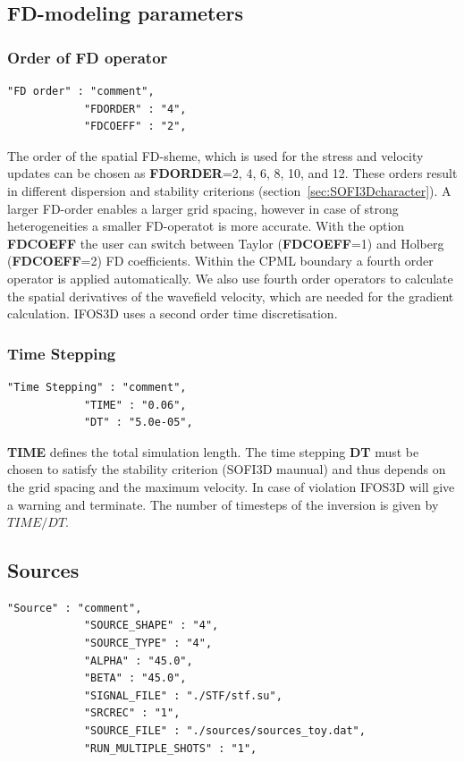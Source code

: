 \subsection{FD-modeling parameters}
\subsubsection*{Order of FD operator}
\begin{verbatim}
"FD order" : "comment",
			"FDORDER" : "4",
			"FDCOEFF" : "2",
\end{verbatim}

The order of the spatial FD-sheme,  which is used for the stress and velocity updates can be chosen as \textbf{FDORDER}=2, 4, 6, 8, 10, and 12. 
These orders result in different dispersion and stability criterions (section~\ref{sec:SOFI3Dcharacter}). A larger FD-order enables a larger grid spacing, however in case of strong heterogeneities a smaller FD-operatot is more accurate. 
With the option \textbf{FDCOEFF} the user can switch between Taylor (\textbf{FDCOEFF}=1) and Holberg (\textbf{FDCOEFF}=2) FD coefficients. Within the CPML boundary a fourth order operator is applied automatically. 
We also use fourth order operators to calculate the spatial derivatives of the wavefield velocity, which are needed for the gradient calculation. IFOS3D uses a second order time discretisation.
\subsubsection*{Time Stepping}
\begin{verbatim}
"Time Stepping" : "comment",
			"TIME" : "0.06",
			"DT" : "5.0e-05",
\end{verbatim}

\textbf{TIME} defines the total simulation length.  The time stepping \textbf{DT} must be chosen to satisfy the stability criterion (SOFI3D  maunual) and thus depends on the grid spacing and the maximum velocity. 
In case of violation IFOS3D will give a warning and terminate. The number of timesteps of the inversion is given by $TIME/DT$.

\subsection{Sources}
\begin{verbatim}
"Source" : "comment",
			"SOURCE_SHAPE" : "4",
			"SOURCE_TYPE" : "4",
			"ALPHA" : "45.0",
			"BETA" : "45.0",
			"SIGNAL_FILE" : "./STF/stf.su",
			"SRCREC" : "1",
			"SOURCE_FILE" : "./sources/sources_toy.dat",
			"RUN_MULTIPLE_SHOTS" : "1",
\end{verbatim}

